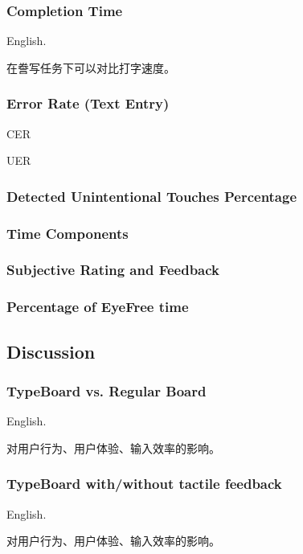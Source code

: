 \subsubsection{Completion Time}

English.

在誊写任务下可以对比打字速度。

\subsubsection{Error Rate (Text Entry)}

CER

UER

\subsubsection{Detected Unintentional Touches Percentage}

\subsubsection{Time Components}

\subsubsection{Subjective Rating and Feedback}

\subsubsection{Percentage of EyeFree time}

\subsection{Discussion}

\subsubsection{TypeBoard vs. Regular Board}

English.

对用户行为、用户体验、输入效率的影响。

\subsubsection{TypeBoard with/without tactile feedback}

English.

对用户行为、用户体验、输入效率的影响。
